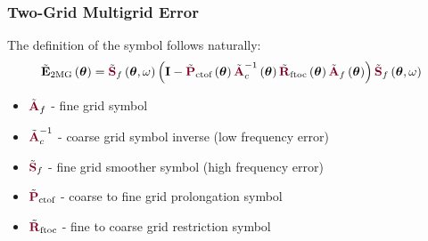 \documentclass{beamer}
\begin{document}
\begin{frame}
\begin{center}
\frametitle{Two-Grid Multigrid Error}

The definition of the symbol follows naturally:\\

\begin{equation}
\tilde{\mathbf{E}}_{\text{2MG}} \left( \boldsymbol{\theta} \right) = \tilde{{\color{burgundy}\mathbf{S}}}_f \left( \boldsymbol{\theta}, \omega \right) \left( \mathbf{I} - \tilde{{\color{burgundy}\mathbf{P}}}_{\text{ctof}} \left( \boldsymbol{\theta} \right) \tilde{{\color{burgundy}\mathbf{A}}}_c^{-1} \left( \boldsymbol{\theta} \right) \tilde{{\color{burgundy}\mathbf{R}}}_{\text{ftoc}} \left( \boldsymbol{\theta} \right) \tilde{{\color{burgundy}\mathbf{A}}}_f \left( \boldsymbol{\theta} \right) \right) \tilde{{\color{burgundy}\mathbf{S}}}_f \left( \boldsymbol{\theta}, \omega \right)
\end{equation}

\begin{itemize}

\item $\tilde{{\color{burgundy}\mathbf{A}}}_f$ - fine grid symbol

\item $\tilde{{\color{burgundy}\mathbf{A}}}_c^{-1}$ - coarse grid symbol inverse (low frequency error)

\item $\tilde{{\color{burgundy}\mathbf{S}}}_f$ - fine grid smoother symbol (high frequency error)

\item $\tilde{{\color{burgundy}\mathbf{P}}}_{\text{ctof}}$ - coarse to fine grid prolongation symbol

\item $\tilde{{\color{burgundy}\mathbf{R}}}_{\text{ftoc}}$ - fine to coarse grid restriction symbol

\end{itemize}

\end{center}
\end{frame}

\end{document}
